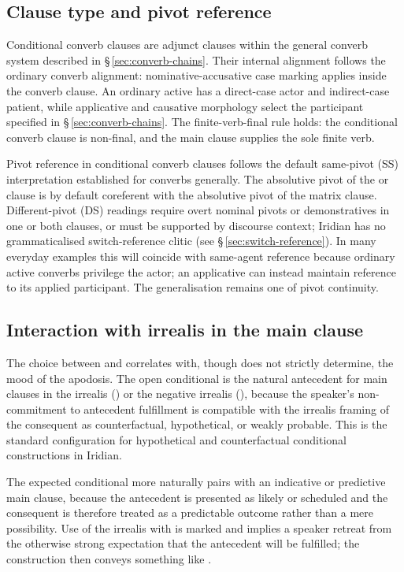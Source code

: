 \subsection{Clause type and pivot reference}\label{sec:cond-subj}

Conditional converb clauses are adjunct clauses within the general converb
system described in §\,\ref{sec:converb-chains}. Their internal alignment
follows the ordinary converb alignment: nominative-accusative case marking
applies inside the converb clause. An ordinary active has a direct-case actor
and indirect-case patient, while applicative and causative morphology select
the participant specified in §\,\ref{sec:converb-chains}. The
finite-verb-final rule holds: the conditional converb clause is non-final, and
the main clause supplies the sole finite verb.

Pivot reference in conditional converb clauses follows the default same-pivot
(SS) interpretation established for converbs generally. The absolutive pivot of
the  or  clause is by default coreferent with the absolutive
pivot of the matrix clause. Different-pivot (DS) readings require overt nominal
pivots or demonstratives in one or both clauses, or must be supported by
discourse context; Iridian has no grammaticalised switch-reference clitic (see
§\,\ref{sec:switch-reference}). In many everyday examples this will coincide
with same-agent reference because ordinary active converbs privilege the
actor; an applicative can instead maintain reference to its applied
participant. The generalisation remains one of pivot continuity.

\subsection{Interaction with irrealis in the main clause}\label{sec:cond-irrealis}

The choice between  and  correlates with, though does not
strictly determine, the mood of the apodosis. The open conditional  is
the natural antecedent for main clauses in the irrealis () or the
negative irrealis (), because the speaker's non-commitment to
antecedent fulfillment is compatible with the irrealis framing of the consequent
as counterfactual, hypothetical, or weakly probable. This is the standard
configuration for hypothetical and counterfactual conditional constructions in
Iridian.

The expected conditional  more naturally pairs with an indicative or
predictive main clause, because the antecedent is presented as likely or
scheduled and the consequent is therefore treated as a predictable outcome
rather than a mere possibility. Use of the irrealis with  is marked
and implies a speaker retreat from the otherwise strong expectation that the
antecedent will be fulfilled; the construction then conveys something like
.


